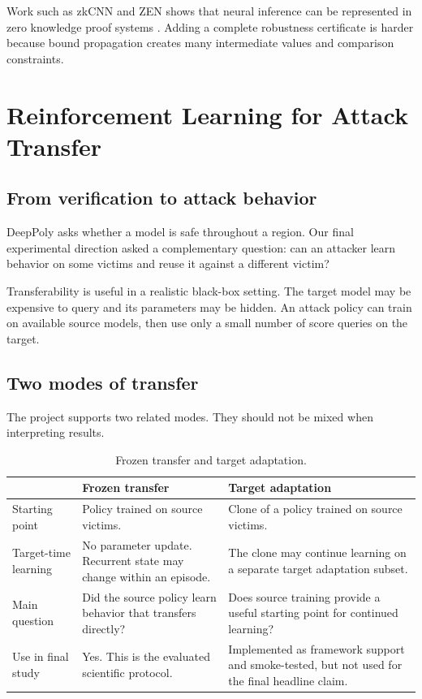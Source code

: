 \documentclass[11pt,a4paper]{report}
\begin{document}
Work such as zkCNN and ZEN shows that neural inference can be represented in zero knowledge proof systems \cite{liu2021zkcnn,feng2021zen}. Adding a complete robustness certificate is harder because bound propagation creates many intermediate values and comparison constraints.

\chapter{Reinforcement Learning for Attack Transfer}

\section{From verification to attack behavior}

DeepPoly asks whether a model is safe throughout a region. Our final experimental direction asked a complementary question: can an attacker learn behavior on some victims and reuse it against a different victim?

Transferability is useful in a realistic black-box setting. The target model may be expensive to query and its parameters may be hidden. An attack policy can train on available source models, then use only a small number of score queries on the target.

\section{Two modes of transfer}

The project supports two related modes. They should not be mixed when interpreting results.

\begin{table}[H]
\centering
\small
\caption{Frozen transfer and target adaptation.}
\begin{tabular}{@{}L{0.16\textwidth}L{0.36\textwidth}L{0.36\textwidth}@{}}
\toprule
 & \textbf{Frozen transfer} & \textbf{Target adaptation} \\
\midrule
Starting point &
Policy trained on source victims. &
Clone of a policy trained on source victims. \\
\midrule
Target-time learning &
No parameter update. Recurrent state may change within an episode. &
The clone may continue learning on a separate target adaptation subset. \\
\midrule
Main question &
Did the source policy learn behavior that transfers directly? &
Does source training provide a useful starting point for continued learning? \\
\midrule
Use in final study &
Yes. This is the evaluated scientific protocol. &
Implemented as framework support and smoke-tested, but not used for the final headline claim. \\
\bottomrule
\end{tabular}
\end{table}
\end{document}
